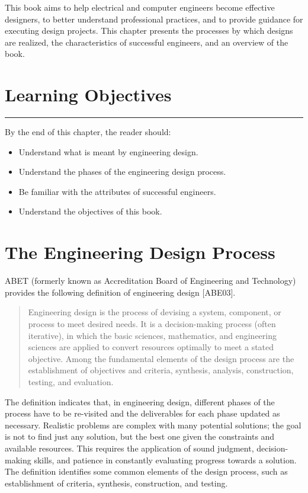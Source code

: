 This book aims to help electrical and computer engineers become
effective designers, to better understand professional practices, and to
provide guidance for executing design projects. This chapter presents
the processes by which designs are realized, the characteristics of
successful engineers, and an overview of the book.

\section*{Learning Objectives}
\noindent\rule{\linewidth}{1pt}
By the end of this chapter, the reader should:
\begin{itemize}
\item Understand what is meant by engineering design.
\item  Understand the phases of the engineering design process.
\item  Be familiar with the attributes of successful engineers.
\item  Understand the objectives of this book.
\end{itemize}

\section{The Engineering Design Process}

ABET (formerly known as Accreditation Board of Engineering and
Technology) provides the following definition of engineering design
{[}ABE03{]}.

\begin{quote}
Engineering design is the process of devising a system, component, or
process to meet desired needs. It is a decision-making process (often
iterative), in which the basic sciences, mathematics, and engineering
sciences are applied to convert resources optimally to meet a stated
objective. Among the fundamental elements of the design process are the
establishment of objectives and criteria, synthesis, analysis,
construction, testing, and evaluation.
\end{quote}

The definition indicates that, in engineering design, different phases
of the process have to be re-visited and the deliverables for each phase
updated as necessary. Realistic problems are complex with many potential
solutions; the goal is not to find just any solution, but the best one
given the constraints and available resources. This requires the
application of sound judgment, decision-making skills, and patience in
constantly evaluating progress towards a solution. The definition
identifies some common elements of the design process, such as
establishment of criteria, synthesis, construction, and testing.

